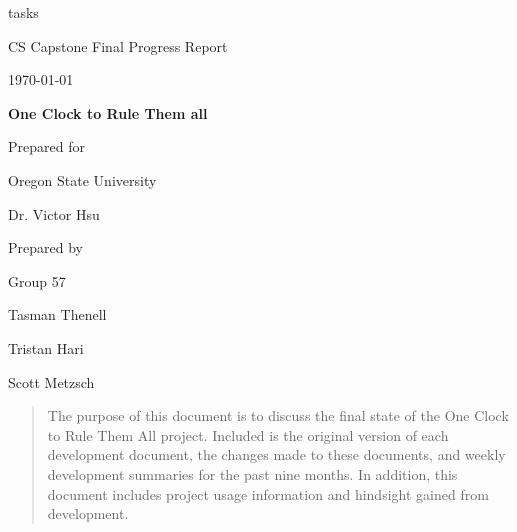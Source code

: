 tasks\documentclass[onecolumn, draftclsnofoot,10pt, compsoc]{IEEEtran}
\def \CapstoneTeamName{		One Clock to Rule Them all}
\def \CapstoneTeamNumber{		57}
\def \GroupMemberOne{			Tasman Thenell}
\def \GroupMemberTwo{			Tristan Hari}
\def \GroupMemberThree{			Scott Metzsch}
\def \CapstoneProjectName{		One Clock to Rule Them all}
\def \CapstoneSponsorCompany{	Oregon State University}
\def \CapstoneSponsorPerson{		Dr. Victor Hsu}
\def \DocType{		%
				Final Progress Report
				}
\newcommand{\NameSigPair}[1]{\par
\makebox[2.75in][r]{#1} \hfil 	\makebox[3.25in]{\makebox[2.25in]{\hrulefill} \hfill		\makebox[.75in]{\hrulefill}}
\par\vspace{-12pt} \textit{\tiny\noindent
\makebox[2.75in]{} \hfil		\makebox[3.25in]{\makebox[2.25in][r]{Signature} \hfill	\makebox[.75in][r]{Date}}}}
\renewcommand{\NameSigPair}[1]{#1}
\begin{document}
\begin{titlepage}
    \begin{singlespace}
        \hfill
        \par\vspace{.2in}
        \centering
        \scshape{
            \huge CS Capstone \DocType \par
            {\large\today}\par
            \vspace{.5in}
            \textbf{\Huge\CapstoneProjectName}\par
            \vfill
            {\large Prepared for}\par
            \Huge \CapstoneSponsorCompany\par
            \vspace{5pt}
            {\Large\NameSigPair{\CapstoneSponsorPerson}\par}
            {\large Prepared by }\par
            Group\CapstoneTeamNumber\par
            \vspace{5pt}
            {\Large
                \NameSigPair{\GroupMemberOne}\par
                \NameSigPair{\GroupMemberTwo}\par
                \NameSigPair{\GroupMemberThree}\par
            }
            \vspace{20pt}
        }
        \begin{abstract}
        	The purpose of this document is to discuss the final state of the One Clock to Rule Them All project.
Included is the original version of each  development document, the changes made to these documents, and weekly development summaries for the past nine months.
In addition, this document includes project usage information and hindsight gained from development.
        \end{abstract}
    \end{singlespace}
\end{titlepage}
\newpage
{}
\singlespacing
\tableofcontents
\clearpage
\onehalfspacing
\end{document}
